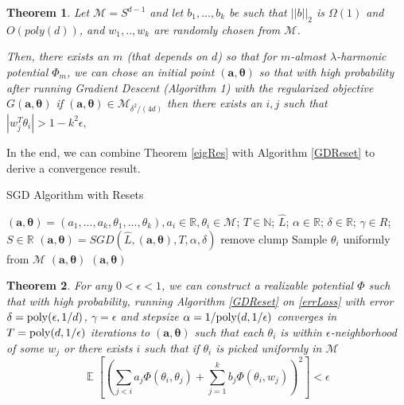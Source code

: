 \documentclass{article}
\newtheorem{theorem}{Theorem}[section]
\newcommand{\N}{{\mathbb{N}}}
\newcommand{\R}{{\mathbb{R}}}
\DeclareMathOperator*{\expt}{\mathbb{E}}
\begin{document}
\begin{theorem}
Let $\mathcal{M} = S^{d-1}$ and let $b_1,...,b_k$ be  such that $||b||_2$ is $\Omega(1)$ and $O(poly(d))$, and $w_1,..,w_k$ are randomly chosen from $\mathcal{M}$. 

Then, there exists an $m$ (that depends on $d$) so that for $m$-almost $\lambda$-harmonic potential $\Phi_m$, we can chose an initial point $(\boldsymbol{a,\theta})$ so that with high probability after running Gradient Descent (Algorithm 1) with the regularized objective $G(\boldsymbol{a,\theta})$ if 
$(\boldsymbol{a,\theta}) \in \mathcal{M}_{\delta^2/(4d)}$ then there exists an
$i, j$ such that
$|w_j^T\theta_i| > 1- k^2\epsilon,$
\end{theorem}


 In the end, we can combine Theorem \ref{eigRes} with Algorithm \ref{GDReset} to derive a convergence result.
 
 \begin{algorithm}[tb]
 \caption{SGD Algorithm with Resets}
   \label{GDReset}
\begin{algorithmic}
  $(\boldsymbol{a,\theta}) = (a_1,...,a_k,\theta_1,...,\theta_k), a_i
  \in\R, \theta_i\in\mathcal{M}$;
  $T\in \N$; $\widehat{L}$; $\alpha\in \R$; $\delta \in \R$;
  $\gamma \in R$; $S \in \R$ \vspace{0.1in} 
  \STATE $(\boldsymbol{a},\boldsymbol{\theta}) = SGD \left(\widehat{L}, (\boldsymbol{a},\boldsymbol{\theta}),T, \alpha,\delta \right)$
    \STATE remove clump
    \REPEAT \STATE Sample $\theta_i$
  uniformly from $\mathcal{M}$
    \ELSE {} $(\boldsymbol{a}, \boldsymbol{\theta}) $
      \ENDIF
    \ENDFOR
    $(\boldsymbol{a}, \boldsymbol{\theta}) $
   \end{algorithmic}
\end{algorithm}

\begin{theorem}
For any $0 < \epsilon < 1$, we can construct a realizable potential $\Phi$ such that with high probability, running Algorithm \ref{GDReset} on \eqref{errLoss} with error $\delta = \mathrm{poly}(\epsilon,1/d)$, $\gamma = \epsilon$ and stepsize $\alpha = 1/\mathrm{poly}(d,1/\epsilon)$ converges in $T = \mathrm{poly}(d, 1/\epsilon)$ iterations to $(\boldsymbol{a,\theta})$ such that each $\theta_i$ is within $\epsilon$-neighborhood of some $w_j$ or there exists $i$ such that if $\theta_i$ is picked uniformly in $\mathcal{M}$
%
\[ \expt\left[\left( \sum_{j < i} a_j \Phi(\theta_i,\theta_j) + \sum_{j=1}^k b_j \Phi(\theta_i,w_j)\right)^2\right] < \epsilon\]
\end{theorem}
\end{document}
